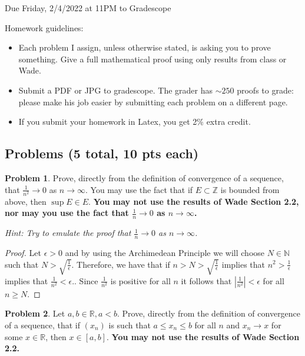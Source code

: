 \documentclass[11pt]{article}
\theoremstyle{definition}
\newtheorem{problem}{Problem}
\newcommand{\N}{\mathbb{N}}
\newcommand{\R}{\mathbb{R}}
\newcommand{\Z}{\mathbb{Z}}
\begin{document}
  \hfill Due Friday, 2/4/2022 at 11PM to Gradescope

\bigskip

\noindent Homework guidelines: 
\begin{itemize}
\item Each problem I assign, unless otherwise stated, is asking you to prove something. Give a full mathematical proof using only results from class or Wade.
\item Submit a PDF or JPG to gradescope. The grader has $\sim 250$ proofs to grade:  please make his job easier by submitting each problem on a different page. 
\item If you submit your homework in Latex, you get 2\% extra credit. 
\end{itemize}

\subsection*{Problems (5 total, 10 pts each)}

\begin{problem}
Prove, directly from the definition of convergence of a sequence, that $\frac{1}{n^2} \to 0$ as $n \to \infty$. You may use the fact that if $E \subset \Z$ is bounded from above, then $\sup E \in E$. {\bf You may not use the results of Wade Section 2.2, nor may you use the fact that $\frac1n \to 0$ as $n \to \infty$. }

\emph{Hint: Try to emulate the proof that $\frac1n \to 0$ as $n \to \infty$.}
\end{problem}

\begin{proof}
Let $\epsilon > 0$ and by using the Archimedean Principle we will choose $N\in \N$ such that $N > \sqrt{\frac{1}{\epsilon}}.$ Therefore, we have that if $n> N > \sqrt{\frac{1}{\epsilon}}$ implies that $n^2 > \frac{1}{\epsilon}$ implies that $\frac{1}{n^2}<\epsilon.$. Since $\frac{1}{n^2}$ is positive for all $n$ it follows that $|\frac{1}{n^2}|<\epsilon$ for all $n \geq N.$
\end{proof}

\newpage

\begin{problem}
Let $a, b \in \R, a < b$. Prove, directly from the definition of convergence of a sequence, that if $(x_n)$ is such that $a \leq x_n \leq b$ for all $n$ and $x_n \to x$ for some $x \in \R$, then $x \in [a,b]$. {\bf You may not use the results of Wade Section 2.2.
}\end{problem}
\end{document}
